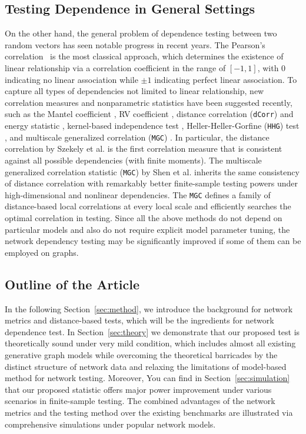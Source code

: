 \documentclass[11pt]{article}
\theoremstyle{definition}
\begin{document}
	\subsection{Testing Dependence in General Settings}
	On the other hand, the general problem of dependence testing between two random vectors has seen notable progress in recent years. The Pearson's correlation~\cite{Pearson1895} is the most classical approach, which determines the existence of linear relationship via a correlation coefficient in the range of $[-1,1]$, with $0$ indicating no linear association while $\pm 1$ indicating perfect linear association. To capture all types of dependencies not limited to linear relationship, new correlation measures and nonparametric statistics have been suggested recently, such as the Mantel coefficient \cite{mantel1967}, RV coefficient \cite{RobertEscoufier1976}, distance correlation (\texttt{dCorr}) and energy statistic \cite{szekely2007measuring,szekelyRizzo2013a, RizzoSzekely2016}, kernel-based independence test \cite{GrettonGyorfi2010}, Heller-Heller-Gorfine (\texttt{HHG}) test \cite{HellerGorfine2013,heller2016consistent}, and multiscale generalized correlation (\texttt{MGC}) \cite{shen2016discovering}. In particular, the distance correlation by Szekely et al. \cite{szekely2007measuring} is the first correlation measure that is consistent against all possible dependencies (with finite moments). The multiscale generalized correlation statistic (\texttt{MGC}) by Shen et al. \cite{shen2016discovering} inherits the same consistency of distance correlation with remarkably better finite-sample testing powers under high-dimensional and nonlinear dependencies. The \texttt{MGC} defines a family of distance-based local correlations at every local scale and efficiently searches the optimal correlation in testing. Since all the above methods do not depend on particular models and also do not require explicit model parameter tuning, the network dependency testing may be significantly improved if some of them can be employed on graphs.
	
	\subsection{Outline of the Article}
	In the following Section~\ref{sec:method}, we introduce the background for network metrics and distance-based tests, which will be the ingredients for network dependence test. In Section~\ref{sec:theory} we demonstrate that our proposed test is theoretically sound under very mild condition, which includes almost all existing generative graph models while overcoming the theoretical barricades by the distinct structure of network data and relaxing the limitations of model-based method for network testing. Moreover, You can find in Section~\ref{sec:simulation} that our proposed statistic offers major power improvement under various scenarios in finite-sample testing. The combined advantages of the network metrics and the testing method over the existing benchmarks are illustrated via comprehensive simulations under popular network models.
	
\end{document}
